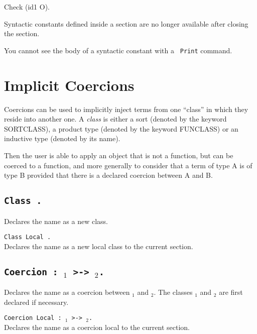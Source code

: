 {\begin{coq_example}
\begin{coq_example}
Check (id1 O).
\end{coq_example}


\begin{Warnings}
\item Syntactic constants defined inside a section are no longer
  available after closing the section.
\item You cannot see the body of a syntactic constant with a {\tt
    Print} command.
\end{Warnings}

\section{Implicit Coercions}
\label{Coercions}

Coercions can be used to implicitly inject terms from one ``class'' in
which they reside into another one. A {\em class} is either a sort
(denoted by the keyword SORTCLASS), a product type (denoted by the
keyword FUNCLASS) or an inductive type (denoted by its name).

Then the user is able to apply an
object that is not a function, but can be coerced to a function, and
more generally to consider that a term of type A is of type B provided
that there is a declared coercion between A and B.

\subsection{\tt Class {\ident}.}
Declares the name {\ident} as a new class.

\begin{Variant}
\item {\tt Class Local {\ident}.} \\
Declares the name {\ident} as a new local class to the current section.
\end{Variant}

\subsection{\tt Coercion {\ident} : {\ident$_1$} >-> {\ident$_2$}.}

Declares the name {\ident} as a coercion between {\ident$_1$} and
{\ident$_2$}. The classes {\ident$_1$} and {\ident$_2$} are first
declared if necessary.

\begin{Variants}
\item {\tt Coercion Local {\ident} : {\ident$_1$} >-> {\ident$_2$}.}\\
Declares the name {\ident} as a coercion local to the current section.


\end{Variants}
\end{coq_example}}
